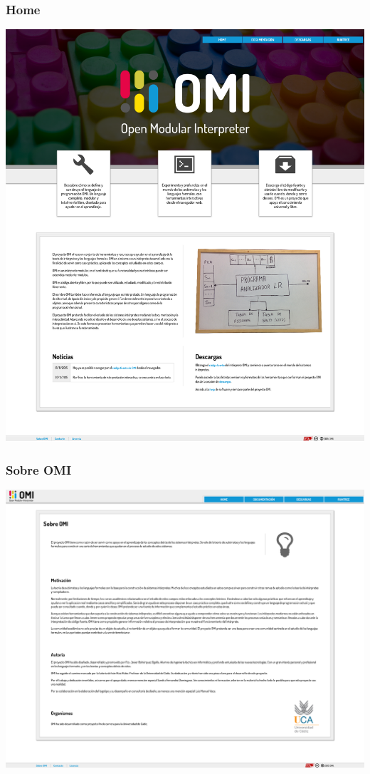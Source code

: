 \subsubsection{Home}
\begin{center}
\includegraphics[scale=0.2]{home.png} \\
\end{center}

\subsubsection{Sobre OMI}
\begin{center}
\includegraphics[scale=0.2]{about.png} \\
\end{center}

